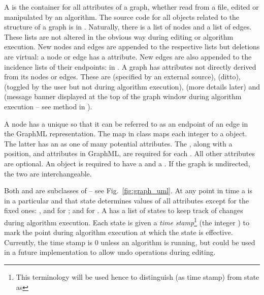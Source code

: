 A  is the container for all attributes of a graph, whether read
from a file, edited or manipulated by an algorithm.
The source code for all objects related to the structure of a graph is in
.
Naturally, there is a list of nodes and a list of edges.
These lists are not altered in the obvious way during editing or algorithm
execution. New nodes and edges are appended to the respective lists but
deletions are virtual: a node or edge has a  attribute.
New edges are also appended to the incidence lists of their endpoints:
 in .
A graph has attributes not directly derived from its nodes or edges. These
are  (specified by an external source),  (ditto),
 (toggled by the user but not during algorithm execution),
 (more details later) and  (message banner
displayed at the top of the graph window during algorithm execution -- see
method  in ).

A node has a unique  so that it can be referred to as an endpoint of
an edge in the GraphML representation. The map  in class
 maps each integer  to a  object.
The latter has an  as one of many potential attributes.
The , along with a position,  and  attributes in
GraphML, are required for each . All other attributes are
optional.
An  object is required to have a  and a
. If the graph is undirected, the two are interchangeable.

Both  and  are subclasses of  -- see
Fig.~\ref{fig:graph_uml}.
At any point in time a  is in a particular
 and that state determines values of all attributes
except for the fixed ones: ,  and  for ;
 and  for .
A  has a list of states to keep track of changes during
algorithm execution.
Each state is given a \emph{time stamp}\footnote{This terminology will be
  used hence to distinguish  (as time stamp) from state as
  } (the integer ) to mark the point
during algorithm execution at which the state is effective. Currently, the
time stamp is 0 unless an algorithm is running, but could be used in a future
implementation to allow undo operations during editing.

